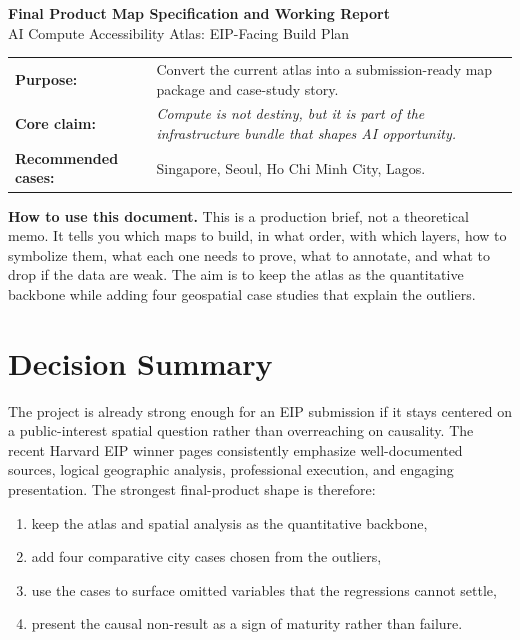 \documentclass[11pt]{article}
\begin{document}
\begin{center}
    {\LARGE \textbf{Final Product Map Specification and Working Report}}\\[0.4em]
    {\large AI Compute Accessibility Atlas: EIP-Facing Build Plan}\\[0.8em]
    \begin{tabularx}{0.9\textwidth}{>{\bfseries\RaggedLeft\arraybackslash}P{0.23\textwidth}Y}
    Purpose: & Convert the current atlas into a submission-ready map package and case-study story. \\
    Core claim: & \emph{Compute is not destiny, but it is part of the infrastructure bundle that shapes AI opportunity.} \\
    Recommended cases: & Singapore, Seoul, Ho Chi Minh City, Lagos. \\
    \end{tabularx}
\end{center}

\vspace{0.8em}
\noindent\colorbox{soft}{\parbox{\dimexpr\textwidth-2\fboxsep\relax}{
\textbf{How to use this document.} This is a production brief, not a theoretical memo. It tells you which maps to build, in what order, with which layers, how to symbolize them, what each one needs to prove, what to annotate, and what to drop if the data are weak. The aim is to keep the atlas as the quantitative backbone while adding four geospatial case studies that explain the outliers.}}

\section{Decision Summary}

The project is already strong enough for an EIP submission if it stays centered on a public-interest spatial question rather than overreaching on causality. The recent Harvard EIP winner pages consistently emphasize well-documented sources, logical geographic analysis, professional execution, and engaging presentation.
The strongest final-product shape is therefore:
\begin{enumerate}[leftmargin=1.4em,itemsep=0.25em]
    \item keep the atlas and spatial analysis as the quantitative backbone,
    \item add four comparative city cases chosen from the outliers,
    \item use the cases to surface omitted variables that the regressions cannot settle,
    \item present the causal non-result as a sign of maturity rather than failure.
\end{enumerate}
\end{document}
